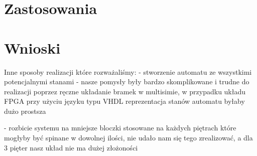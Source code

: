 \documentclass[a4paper]{article}
\begin{document}
\section{Zastosowania}
\section{Wnioski}
Inne sposoby realizacji które rozważaliśmy:
 - stworzenie automatu ze wszystkimi potencjalnymi stanami - nasze pomysły były bardzo skomplikowane
    i trudne do realizacji poprzez ręczne układanie bramek w multisimie, w przypadku układu FPGA
    przy użyciu języku typu VHDL reprezentacja stanów automatu byłaby dużo prostsza

- rozbicie systemu na mniejsze bloczki stosowane na każdych piętrach które mogłyby być 
    spinane w dowolnej ilości, nie udało nam się tego zrealizować, a dla 3 pięter nasz układ
    nie ma dużej złożoności
\end{document}
